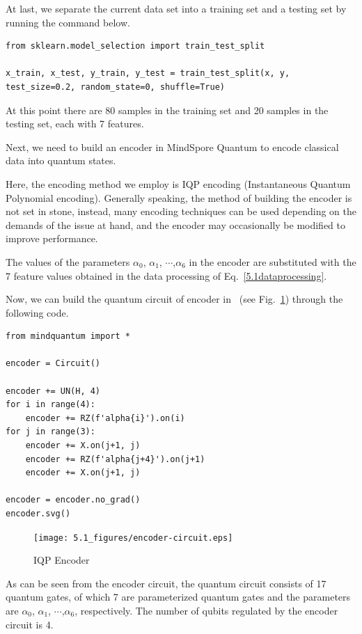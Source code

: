 At last, we separate the current data set into a training set and a testing set by running the command below.

\begin{lstlisting}
from sklearn.model_selection import train_test_split

x_train, x_test, y_train, y_test = train_test_split(x, y, test_size=0.2, random_state=0, shuffle=True)
\end{lstlisting}

At this point there are 80 samples in the training set and 20 samples in the testing set, each with 7 features.

Next, we need to build an encoder in MindSpore Quantum to encode classical data into quantum states.

Here, the encoding method we employ is IQP encoding (Instantaneous Quantum Polynomial encoding). Generally speaking, the method of building the encoder is not set in stone, instead, many encoding techniques can be used depending on the demands of the issue at hand, and the encoder may occasionally be modified to improve performance.

The values of the parameters $\alpha_0$, $\alpha_1$, $\cdots$,$\alpha_6$ in the encoder are substituted with the 7 feature values obtained in the data processing of Eq.~\eqref{5.1dataprocessing}.

Now, we can build the quantum circuit of encoder in \MindQuantum\ (see Fig.~\ref{5.1encoder-circuit}) through the following code.

\begin{lstlisting}
from mindquantum import *

encoder = Circuit()

encoder += UN(H, 4)
for i in range(4):
    encoder += RZ(f'alpha{i}').on(i)
for j in range(3):
    encoder += X.on(j+1, j)
    encoder += RZ(f'alpha{j+4}').on(j+1)
    encoder += X.on(j+1, j)

encoder = encoder.no_grad()
encoder.svg()
\end{lstlisting}

\begin{figure}[H]
    \centering
    \texttt{[image: 5.1\_figures/encoder-circuit.eps]}
    \caption{IQP Encoder}
    \label{5.1encoder-circuit}
\end{figure}

As can be seen from the encoder circuit, the quantum circuit consists of 17 quantum gates, of which 7 are
parameterized quantum gates and the parameters are $\alpha_0$, $\alpha_1$, $\cdots$,$\alpha_6$, respectively. The number of qubits regulated by the encoder circuit is 4.

